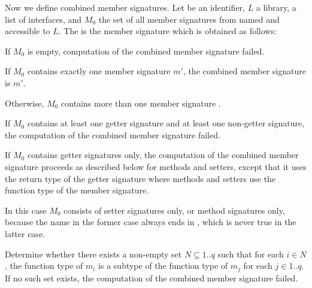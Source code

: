 \documentclass[makeidx]{article}
\begin{document}
\LMHash{}%
Now we define combined member signatures.
Let \id{} be an identifier, $L$ a library,
 a list of interfaces,
and $M_0$ the set of
all member signatures from  named \id{}
and accessible to $L$.
The
is the member signature which is obtained as follows:

\LMHash{}%
If $M_0$ is empty, computation of the combined member signature failed.

\LMHash{}%
If $M_0$ contains exactly one member signature $m'$,
the combined member signature is $m'$.

\LMHash{}%
Otherwise, $M_0$ contains more than one member signature .

\LMHash{}%
If $M_0$ contains at least one getter signature
and at least one non-getter signature,
the computation of the combined member signature failed.
\EndCase

\LMHash{}%
If $M_0$ contains getter signatures only,
the computation of the combined member signature proceeds as described below
for methods and setters,
except that it uses the return type of the getter signature
where methods and setters use the function type of the member signature.
\EndCase

\LMHash{}%
In this case $M_0$ consists of setter signatures only,
or method signatures only,
because the name \id{} in the former case always ends in \lit{=},
which is never true in the latter case.

\LMHash{}%
Determine whether there exists a non-empty set $N \subseteq 1 .. q$ such that
for each $i \in N$,
the function type of $m_i$ is a subtype of
the function type of $m_j$ for each $j \in 1 .. q$.
%
If no such set exists, the computation of the combined member signature failed.
\end{document}
